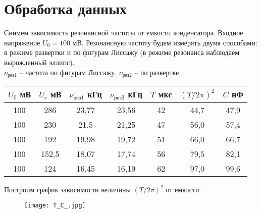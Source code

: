 
% 



    
     
    
    
    \section{Обработка данных}
	
	
	Снимем зависимость резонансной частоты от емкости конденсатора. Входное напряжение $U_0 = 100$ мВ. Резонансную частоту будем измерять двумя способами: в режиме развертки и по фигурам Лиссажу (в режиме резонанса наблюдаем вырожденный эллипс).\\
	$\nu_{\text{рез1}}$ -- частота по фигурам Лиссажу, $\nu_{\text{рез2}}$ -- по развертке.
	
	\begin{table}[h!]
		\begin{center}
			\begin{tabular}{|c|c|c|c|c|c|c|}
				\hline
				$U_0$ мВ & $U_c$ мВ & $\nu_{\text{рез1}}$ кГц & $\nu_{\text{рез2}}$ кГц & $T$ мкс & $(T/2 \pi)^2$ & $C$ нФ \\ \hline
				100      & 286      & 23,77                   & 23,56                   & 42      & 44,7          & 47,9   \\ \hline
				100      & 230      & 21,5                    & 21,25                   & 47      & 56,0          & 57,4   \\ \hline
				100      & 192      & 19,98                   & 19,72                   & 51      & 66,0          & 66,7   \\ \hline
				100      & 152,5    & 18,07                   & 17,74                   & 56      & 79,5          & 82,1   \\ \hline
				100      & 124      & 16,45                   & 16,19                   & 62      & 97,0          & 99,6   \\ \hline
			\end{tabular}
		\end{center}
	\end{table}
	
	Построим график зависимости величины $(T/2 \pi)^2$ от емкости.
	
	\begin{figure}[h!]
		\centering
		\texttt{[image: T\_C\_.jpg]}
		\caption{}
	\end{figure}
	
